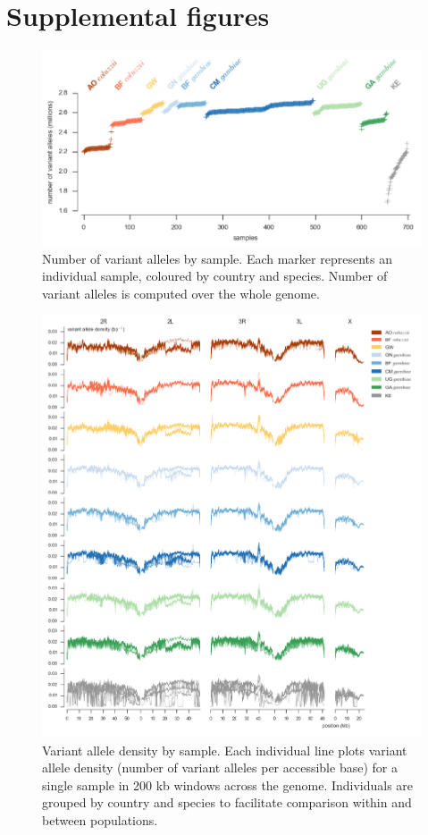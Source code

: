 \documentclass[a4paper,11pt,abstracton,hidelinks]{scrartcl}
\begin{document}
\section{Supplemental figures}\label{sec:supplemental-figures}


\begin{figure}[h]
\centering
\includegraphics[width=1\textwidth,center]{artwork/chapter3/sample_variant_count.pdf}
\caption{Number of variant alleles by sample.
%
Each marker represents an individual sample, coloured by country and species.
%
Number of variant alleles is computed over the whole genome.
}
%
\label{fig:sample_variant_count}
\end{figure}


\clearpage
\begin{figure}[h]
\centering
\includegraphics[width=1.1\textwidth,center]{artwork/chapter3/sample_variant_density.pdf}
\caption{Variant allele density by sample.
%
Each individual line plots variant allele density (number of variant alleles per accessible base) for a single sample in 200 kb windows across the genome.
%
Individuals are grouped by country and species to facilitate comparison within and between populations.
}
%
\label{fig:sample_variant_density}
\end{figure}
\end{document}
